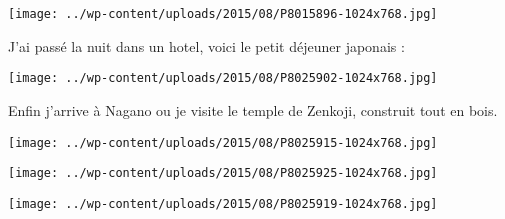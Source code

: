  

 

\begin{center} \texttt{[image: ../wp-content/uploads/2015/08/P8015896-1024x768.jpg]} \end{center}

 

 J'ai passé la nuit dans un hotel, voici le petit déjeuner japonais : 

 

\begin{center} \texttt{[image: ../wp-content/uploads/2015/08/P8025902-1024x768.jpg]} \end{center}

 

 Enfin j'arrive à Nagano ou je visite le temple de Zenkoji, construit tout en bois. 

 

\begin{center} \texttt{[image: ../wp-content/uploads/2015/08/P8025915-1024x768.jpg]} \end{center}

 

 

\begin{center} \texttt{[image: ../wp-content/uploads/2015/08/P8025925-1024x768.jpg]} \end{center}

 

 

\begin{center} \texttt{[image: ../wp-content/uploads/2015/08/P8025919-1024x768.jpg]} \end{center}




 
 
